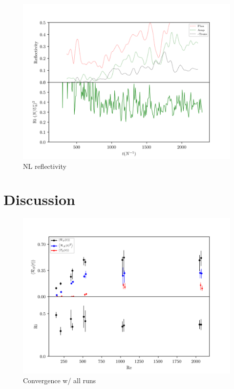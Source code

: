 \documentclass[
        fleqn,
        usenatbib,
    ]{mnras}
\begin{document}
\begin{figure}[t]
    \centering
    \includegraphics[width=\columnwidth]{plots/nl_f_refl.png}
    \caption{NL reflectivity}\label{fig:nl_refl}
\end{figure}

\section{Discussion}\label{s:discussion}

\begin{figure}[t]
    \centering
    \includegraphics[width=\columnwidth]{plots/agg.png}
    \caption{Convergence w/ all runs}\label{fig:agg}
\end{figure}
\end{document}
